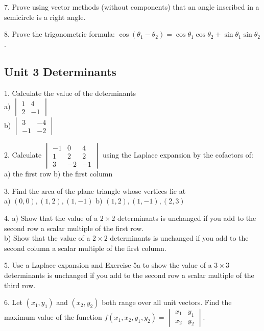 \documentclass{article}
\begin{document}
7. Prove using vector methods (without components) that an angle inscribed in
a semicircle is a right angle.

8. Prove the trigonometric formula: $\cos(\theta_{1} - \theta_{2}) =
\cos\theta_{1}\cos\theta_{2} + \sin\theta_{1}\sin\theta_{2}$.

\subsection*{Unit 3 Determinants}

1. Calculate the value of the determinants\\
a) $\begin{vmatrix}
    1 & 4 \\
    2 & -1
\end{vmatrix}$\\
b) $\begin{vmatrix}
    3 & -4 \\
    -1 & -2
\end{vmatrix}$

2. Calculate $\begin{vmatrix}
    -1 & 0 & 4 \\
    1 & 2 & 2 \\
    3 & -2 & -1
\end{vmatrix}$ using the Laplace expansion by the cofactors of:\\
a) the first row \hspace{10px} b) the first column

3. Find the area of the plane triangle whose vertices lie at\\
a) $(0, 0), (1, 2), (1, -1)$ \hspace{10px} b) $(1, 2), (1, -1), (2, 3)$

4. a) Show that the value of a $2 \times 2$ determinants is unchanged if you add
to the second row a scalar multiple of the first row.\\
   b) Show that the value of a $2 \times 2$ determinants is unchanged if you add
to the second column a scalar multiple of the first column.

5. Use a Laplace expansion and Exercise 5a to show the value of a $3 \times 3$
determinants is unchanged if you add to the second row a scalar multiple of the
third row.

6. Let $(x_{1}, y_{1})$ and $(x_{2}, y_{2})$ both range over all unit vectors.
Find the maximum value of the function $f(x_{1}, x_{2}, y_{1}, y_{2}) =
\begin{vmatrix}
x_{1} & y_{1} \\
x_{2} & y_{2}   
\end{vmatrix}$.
\end{document}
